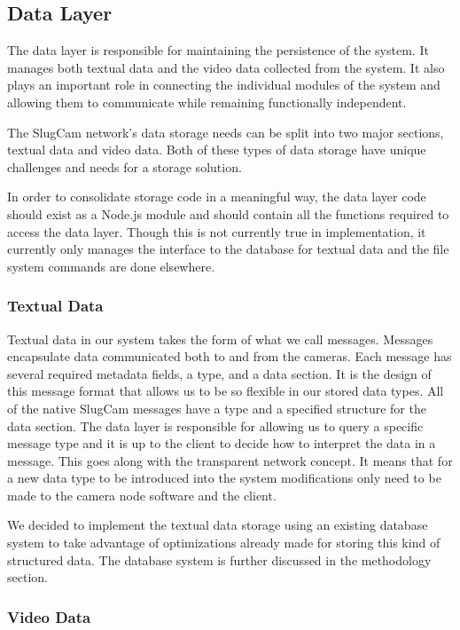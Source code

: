 \subsection{Data Layer}

The data layer is responsible for maintaining the persistence of the system. It
manages both textual data and the video data collected from the system. It also
plays an important role in connecting the individual modules of the system and
allowing them to communicate while remaining functionally independent.

The SlugCam network's data storage needs can be split into two major sections,
textual data and video data. Both of these types of data storage have unique
challenges and needs for a storage solution.

In order to consolidate storage code in a meaningful way, the data layer code
should exist as a Node.js module and should contain all the functions required
to access the data layer. Though this is not currently true in implementation,
it currently only manages the interface to the database for textual data and the
file system commands are done elsewhere.

\subsubsection{Textual Data}

Textual data in our system takes the form of what we call messages. Messages
encapsulate data communicated both to and from the cameras. Each message has
several required metadata fields, a type, and a data section. It is the design
of this message format that allows us to be so flexible in our stored data
types. All of the native SlugCam messages have a type and a specified structure
for the data section. The data layer is responsible for allowing us to query a
specific message type and it is up to the client to decide how to interpret the
data in a message. This goes along with the transparent network concept. It
means that for a new data type to be introduced into the system modifications
only need to be made to the camera node software and the client.

We decided to implement the textual data storage using an existing database
system to take advantage of optimizations already made for storing this kind of
structured data. The database system is further discussed in the methodology
section.

\subsubsection{Video Data}

